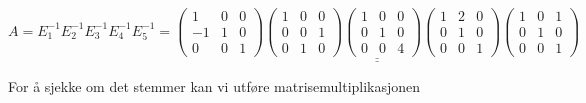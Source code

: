 \documentclass{article}
\newcommand{\vect}[1]{\begin{pmatrix} #1 \end{pmatrix}}
\newcommand{\uu}[1]{\underline{\underline{#1}}}
\begin{document}
\\\\\\\\\)
\[A = E_1^{-1}E_2^{-1}E_3^{-1}E_4^{-1}E_5^{-1} = \uu{
\vect{1&0&0\\-1&1&0\\0&0&1} \vect{1&0&0\\0&0&1\\0&1&0} \vect{1&0&0\\0&1&0\\0&0&4} \vect{1&2&0\\0&1&0\\0&0&1} \vect{1&0&1\\0&1&0\\0&0&1}
}
\]

\vspace{1em}
For å sjekke om det stemmer kan vi utføre matrisemultiplikasjonen
\end{document}
